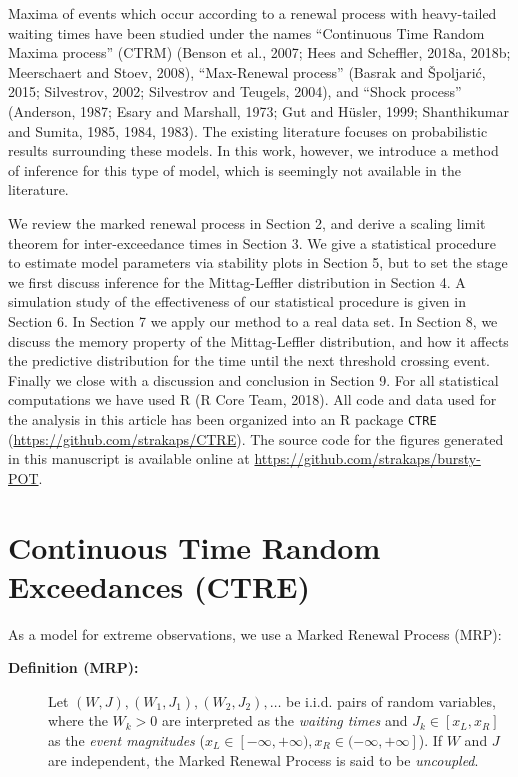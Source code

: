 \documentclass[]{elsarticle} %
\begin{document}
Maxima of events which occur according to a renewal process with
heavy-tailed waiting times have been studied under the names
``Continuous Time Random Maxima process'' (CTRM) (Benson et al., 2007;
Hees and Scheffler, 2018a, 2018b; Meerschaert and Stoev, 2008),
``Max-Renewal process'' (Basrak and Špoljarić, 2015; Silvestrov, 2002;
Silvestrov and Teugels, 2004), and ``Shock process'' (Anderson, 1987;
Esary and Marshall, 1973; Gut and Hüsler, 1999; Shanthikumar and Sumita,
1985, 1984, 1983). The existing literature focuses on probabilistic
results surrounding these models. In this work, however, we introduce a
method of inference for this type of model, which is seemingly not
available in the literature.

We review the marked renewal process in Section 2, and derive a scaling
limit theorem for inter-exceedance times in Section 3. We give a
statistical procedure to estimate model parameters via stability plots
in Section 5, but to set the stage we first discuss inference for the
Mittag-Leffler distribution in Section 4. A simulation study of the
effectiveness of our statistical procedure is given in Section 6. In
Section 7 we apply our method to a real data set. In Section 8, we
discuss the memory property of the Mittag-Leffler distribution, and how
it affects the predictive distribution for the time until the next
threshold crossing event. Finally we close with a discussion and
conclusion in Section 9. For all statistical computations we have used R
(R Core Team, 2018). All code and data used for the analysis in this
article has been organized into an R package \texttt{CTRE}
(\url{https://github.com/strakaps/CTRE}). The source code for the
figures generated in this manuscript is available online at
\url{https://github.com/strakaps/bursty-POT}.

\hypertarget{continuous-time-random-exceedances-ctre}{%
\section{Continuous Time Random Exceedances
(CTRE)}\label{continuous-time-random-exceedances-ctre}}

As a model for extreme observations, we use a Marked Renewal Process
(MRP):

\begin{description}
\item[\textbf{Definition (MRP):}]
Let \((W,J), (W_1, J_1), (W_2, J_2), \ldots\) be i.i.d. pairs of random
variables, where the \(W_k > 0\) are interpreted as the \emph{waiting
times} and \(J_k \in [x_L, x_R]\) as the \emph{event magnitudes}
(\(x_L \in [-\infty, +\infty), x_R \in (-\infty, +\infty]\)). If \(W\)
and \(J\) are independent, the Marked Renewal Process is said to be
\emph{uncoupled}.
\end{description}
\end{document}
